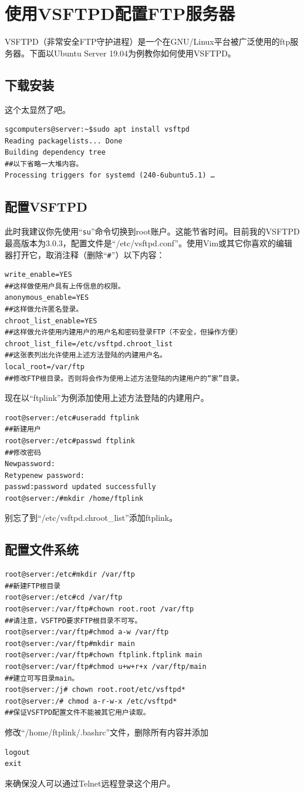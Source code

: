 \section{使用VSFTPD配置FTP服务器}
VSFTPD（非常安全FTP守护进程）是一个在GNU/Linux平台被广泛使用的ftp服务器。下面以Ubuntu Server 19.04为例教你如何使用VSFTPD。
\subsection{下载安装}
这个太显然了吧。
\begin{verbatim}
sgcomputers@server:~$sudo apt install vsftpd
Reading packagelists... Done
Building dependency tree
##以下省略一大堆内容。
Processing triggers for systemd (240-6ubuntu5.1) …
\end{verbatim}
\subsection{配置VSFTPD}
此时我建议你先使用“\verb|su|”命令切换到root账户。这能节省时间。目前我的VSFTPD最高版本为3.0.3，配置文件是“/etc/vsftpd.conf”。使用Vim或其它你喜欢的编辑器打开它，取消注释（删除“\verb|#|”）以下内容：
\begin{verbatim}
write_enable=YES
##这样做使用户具有上传信息的权限。
anonymous_enable=YES
##这样做允许匿名登录。
chroot_list_enable=YES
##这样做允许使用内建用户的用户名和密码登录FTP（不安全，但操作方便）
chroot_list_file=/etc/vsftpd.chroot_list
##这张表列出允许使用上述方法登陆的内建用户名。
local_root=/var/ftp
##修改FTP根目录。否则将会作为使用上述方法登陆的内建用户的“家”目录。
\end{verbatim}\par
现在以“ftplink”为例添加使用上述方法登陆的内建用户。
\begin{verbatim}
root@server:/etc#useradd ftplink
##新建用户
root@server:/etc#passwd ftplink
##修改密码
Newpassword:
Retypenew password:
passwd:password updated successfully
root@server:/#mkdir /home/ftplink
\end{verbatim}\par
别忘了到“/etc/vsftpd.chroot\_list”添加ftplink。
\subsection{配置文件系统}
\begin{verbatim}
root@server:/etc#mkdir /var/ftp
##新建FTP根目录
root@server:/etc#cd /var/ftp
root@server:/var/ftp#chown root.root /var/ftp
##请注意，VSFTPD要求FTP根目录不可写。
root@server:/var/ftp#chmod a-w /var/ftp
root@server:/var/ftp#mkdir main
root@server:/var/ftp#chown ftplink.ftplink main
root@server:/var/ftp#chmod u+w+r+x /var/ftp/main
##建立可写目录main。
root@server:/j# chown root.root/etc/vsftpd*
root@server:/# chmod a-r-w-x /etc/vsftpd*
##保证VSFTPD配置文件不能被其它用户读取。
\end{verbatim}\par
修改“/home/ftplink/.bashrc”文件，删除所有内容并添加
\begin{verbatim}
logout
exit
\end{verbatim}\par
来确保没人可以通过Telnet远程登录这个用户。
